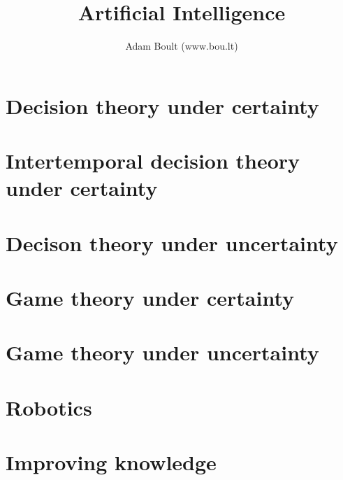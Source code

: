 \documentclass[oneside]{book}
\begin{document}
\author{Adam Boult (www.bou.lt)}
\title{Artificial Intelligence}
\maketitle

\setcounter{tocdepth}{1}
\tableofcontents



\part{Decision theory under certainty}




\part{Intertemporal decision theory under certainty}




\part{Decison theory under uncertainty}






\part{Game theory under certainty}




\part{Game theory under uncertainty}



\part{Robotics}



\part{Improving knowledge}



\end{document}
